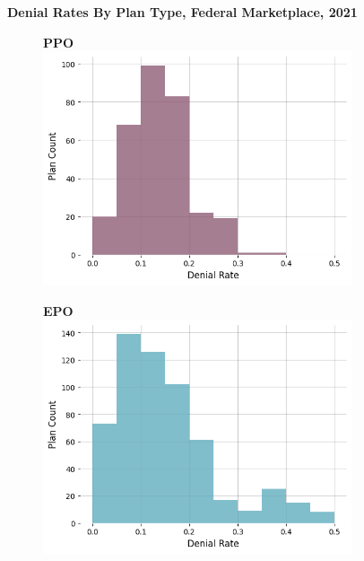 \documentclass[12pt, a4paper,twoside]{report}
\theoremstyle{plain} %
\theoremstyle{definition} %
\theoremstyle{remark} %
\numberwithin{equation}{chapter}
\begin{document}
		
				\begin{figure}
					\textbf{Denial Rates By Plan Type, Federal Marketplace, 2021}
					\vspace{3em}
					\centering
					\begin{subfigure}[t]{0.49\textwidth}
						\centering
						\textbf{PPO}
						\includegraphics[width=\textwidth]{images/cms_puf/PPO_dist.png}
					\end{subfigure}
					\hfill
					\begin{subfigure}[t]{0.49\textwidth}
						\centering
						\textbf{EPO}
						\includegraphics[width=\textwidth]{images/cms_puf/EPO_dist.png}
					\end{subfigure}
					\hfill

\end{figure}
\end{document}
